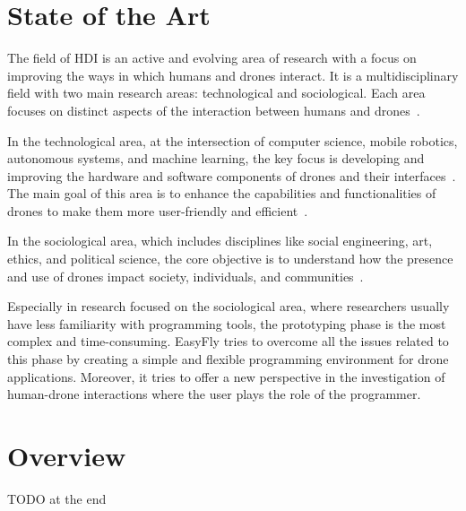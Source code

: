 \section{State of the Art}\label{sec:intro_soa}
The field of HDI is an active and evolving area of research with a focus on improving the ways in which humans
and drones interact. It is a multidisciplinary field with two main research areas: technological and sociological.
Each area focuses on distinct aspects of the interaction between humans and drones~\cite{hri2009davidMaya}.

In the technological area, at the intersection of computer science, mobile robotics, autonomous systems, and machine learning,
the key focus is developing and improving the hardware and software components of drones and their interfaces~\cite{kolling2012towards, giusti2012distributed}.
The main goal of this area is to enhance the capabilities and functionalities of drones to make them more user-friendly and efficient~\cite{cauchard2015droneAndMe}.

In the sociological area, which includes disciplines like social engineering, art, ethics, and political science,
the core objective is to understand how the presence and use of drones impact society, individuals, and communities~\cite{eriksson2020ethicsInMovement, anderson2012accidentally}.


Especially in research focused on the sociological area, where researchers usually have less familiarity with programming tools, 
the prototyping phase is the most complex and time-consuming. 
EasyFly tries to overcome all the issues related to this phase by creating a simple and flexible programming environment for drone applications.
Moreover, it tries to offer a new perspective in the investigation of human-drone interactions where the user plays the role of the programmer.

\section{Overview}\label{sec:intro_overview}

TODO at the end